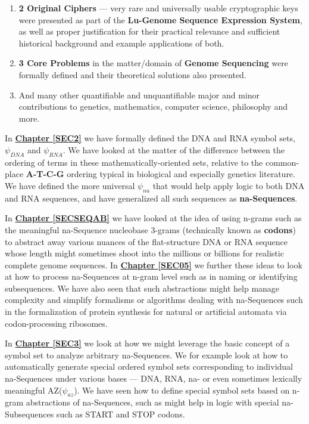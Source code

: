 \documentclass[a4paper, 18pt]{book} %
\begin{document}
\begin{enumerate}
\item \textbf{2 Original Ciphers} --- very rare and universally usable cryptographic keys were presented as part of the \textbf{Lu-Genome Sequence Expression System}, as well as proper justification for their practical relevance and sufficient historical background and example applications of both.
\item \textbf{3 Core Problems} in the matter/domain of \textbf{Genome Sequencing} were formally defined and their theoretical solutions also presented.
\item And many other quantifiable and unquantifiable major and minor contributions to genetics, mathematics, computer science, philosophy and more.
\end{enumerate}


In \textbf{\hyperref[SEC2]{Chapter \ref{SEC2}}} we have formally defined the DNA and RNA symbol sets, $\psi_{DNA}$ and $\psi_{RNA}$. We have looked at the matter of the difference between the ordering of terms in these mathematically-oriented sets, relative to the common-place \textbf{A-T-C-G} ordering typical in biological and especially genetics literature. We have defined the more universal $\psi_{na}$ that would help apply logic to both DNA and RNA sequences, and have generalized all such sequences as \textbf{na-Sequences}.

In \textbf{\hyperref[SECSEQAB]{Chapter \ref{SECSEQAB}}} we have looked at the idea of using n-grams such as the meaningful na-Sequence nucleobase 3-grams (technically known as \textbf{codons}) to abstract away various nuances of the flat-structure DNA or RNA sequence whose length might sometimes shoot into the millions or billions for realistic complete genome sequences. In \textbf{\hyperref[SEC05]{Chapter \ref{SEC05}}} we further these ideas to look at how to process na-Sequences at n-gram level such as in naming or identifying subsequences. We have also seen that such abstractions might help manage complexity and simplify formalisms or algorithms dealing with na-Sequences such in the formalization of protein synthesis for natural or artificial automata via codon-processing ribosomes.


In \textbf{\hyperref[SEC3]{Chapter \ref{SEC3}}} we look at how we might leverage the basic concept of a symbol set to analyze arbitrary na-Sequences. We for example look at how to automatically generate special ordered symbol sets corresponding to individual na-Sequences under various bases --- DNA, RNA, na- or even sometimes lexically meaningful AZ($\psi_{az}$). We have seen how to define special symbol sets based on n-gram abstractions of na-Sequences, such as might help in logic with special na-Subsequences such as START and STOP codons.
\end{document}
